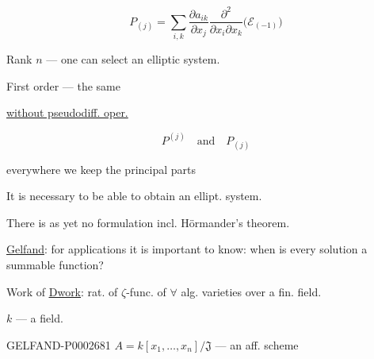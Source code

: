 \begin{equation*}
P_{(j)}=\sum_{i, k}\frac{\partial a_{ik}}{\partial x_j}
\frac{\partial^2}{\partial x_i\partial x_k}\bigl (\mathcal E_{(-1)}\bigr)
\end{equation*}

Rank $n$ --- one can select an elliptic system.

First order --- the same

\underline{without pseudodiff. oper.}

\begin{equation*}P^{(j)}\quad\text{and}\quad P_{(j)}\end{equation*}

everywhere we keep the principal parts

It is necessary to be able to obtain an ellipt. system.

There is as yet no formulation incl. Hörmander’s theorem.



\hfill{}

\underline{Gelfand}: for applications it is important to know: when is every solution a summable function?


Work of \underline{\underline{Dwork}}: rat. of $\zeta$-func. of $\forall$ alg. varieties over a fin. field.

$k$ --- a field.

\begin{GelfandAdjacentEvidence}{GELFAND-P000268}{1}
$A=k[x_1,\ldots, x_n]/\mathfrak J$ --- an aff. scheme

\end{GelfandAdjacentEvidence}


